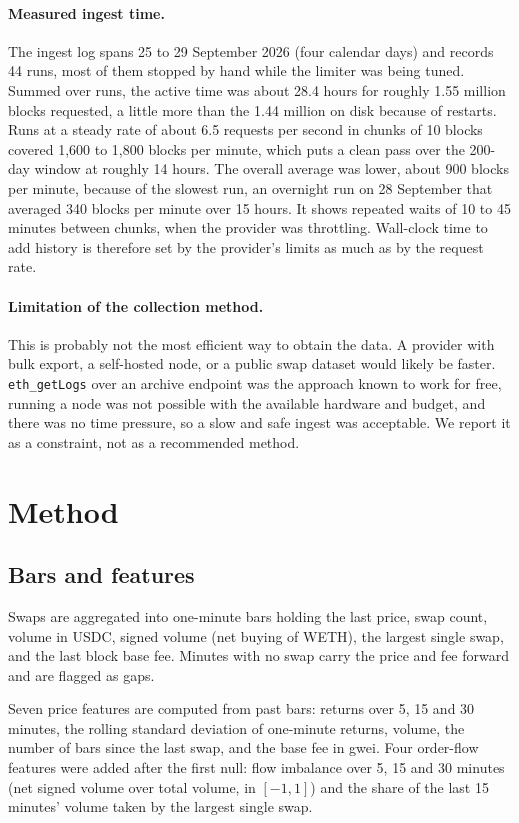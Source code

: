 \documentclass[11pt,a4paper]{article}
\begin{document}
\paragraph{Measured ingest time.}
The ingest log spans 25 to 29 September 2026 (four calendar days) and
records 44 runs, most of them stopped by hand while the limiter was being
tuned. Summed over runs, the active time was about 28.4 hours for roughly
1.55 million blocks requested, a little more than the 1.44 million on disk
because of restarts. Runs at a steady rate of about 6.5 requests per second
in chunks of 10 blocks covered 1,600 to 1,800 blocks per minute, which puts
a clean pass over the 200-day window at roughly 14 hours. The overall average
was lower, about 900 blocks per minute, because of the slowest run, an
overnight run on 28 September that averaged 340 blocks per minute over 15
hours. It shows repeated waits of 10 to 45 minutes between chunks, when the
provider was throttling. Wall-clock time to add history is therefore set by
the provider's limits as much as by the request rate.

\paragraph{Limitation of the collection method.}
This is probably not the most efficient way to obtain the data. A provider
with bulk export, a self-hosted node, or a public swap dataset would likely
be faster. \texttt{eth\_getLogs} over an archive endpoint was the approach
known to work for free, running a node was not possible with the available
hardware and budget, and there was no time pressure, so a slow and safe ingest
was acceptable. We report it as a constraint, not as a recommended method.

\section{Method}
\label{sec:method}

\subsection{Bars and features}

Swaps are aggregated into one-minute bars holding the last price, swap count,
volume in USDC, signed volume (net buying of WETH), the largest single swap,
and the last block base fee. Minutes with no swap carry the price and fee
forward and are flagged as gaps.

Seven price features are computed from past bars: returns over 5, 15 and 30
minutes, the rolling standard deviation of one-minute returns, volume, the
number of bars since the last swap, and the base fee in gwei. Four order-flow
features were added after the first null: flow imbalance over 5, 15 and 30
minutes (net signed volume over total volume, in $[-1,1]$) and the share of
the last 15 minutes' volume taken by the largest single swap.
\end{document}

